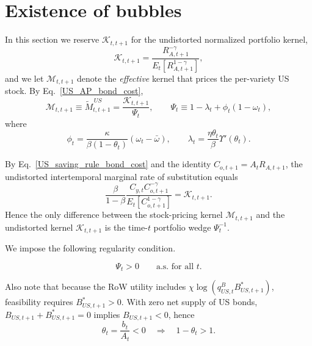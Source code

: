\documentclass{article}
\begin{document}
\section{Existence of bubbles}\label{sec:existence_of_bubbles}

In this section we reserve $\mathcal K_{t,t+1}$ for the undistorted normalized portfolio kernel,
\[
\mathcal K_{t,t+1}
=
\frac{R_{A,t+1}^{-\gamma}}{E_t\!\left[R_{A,t+1}^{1-\gamma}\right]},
\]
and we let $\mathcal M_{t,t+1}$ denote the \emph{effective} kernel that prices the per-variety US stock. By Eq.~\eqref{US_AP_bond_cost},
\begin{equation}\label{effective_US_kernel}
\mathcal M_{t,t+1}
\equiv
\widetilde M^{\,US}_{t,t+1}
=
\frac{\mathcal K_{t,t+1}}{\Psi_t},
\qquad
\Psi_t
\equiv
1-\lambda_t+\phi_t(1-\omega_t),
\end{equation}
where
\[
\phi_t=\frac{\kappa}{\beta(1-\theta_t)}(\omega_t-\bar\omega),
\qquad
\lambda_t=\frac{\eta\theta_t}{\beta}\Upsilon'(\theta_t).
\]

By Eq.~\eqref{US_saving_rule_bond_cost} and the identity $C_{o,t+1}=A_tR_{A,t+1}$, the undistorted intertemporal marginal rate of substitution equals
\[
\frac{\beta}{1-\beta}
\frac{C_{y,t}C_{o,t+1}^{-\gamma}}{E_t\!\left[C_{o,t+1}^{1-\gamma}\right]}
=
\mathcal K_{t,t+1}.
\]
Hence the only difference between the stock-pricing kernel $\mathcal M_{t,t+1}$ and the undistorted kernel $\mathcal K_{t,t+1}$ is the time-$t$ portfolio wedge $\Psi_t^{-1}$.

We impose the following regularity condition.

\begin{ass}\label{ass_regular_kernel}
\[
\Psi_t>0
\qquad\text{a.s. for all }t.
\]
\end{ass}

Also note that because the RoW utility includes $\chi\log(q^B_{US,t}B^*_{US,t+1})$, feasibility requires $B^*_{US,t+1}>0$. With zero net supply of US bonds, $B_{US,t+1}+B^*_{US,t+1}=0$ implies $B_{US,t+1}<0$, hence
\begin{equation}\label{theta_nonpos}
\theta_t=\frac{b_t}{A_t}<0
\quad\Rightarrow\quad
1-\theta_t>1.
\end{equation}
\end{document}
